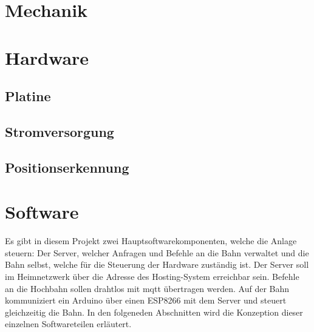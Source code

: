 \section{Mechanik}
\section{Hardware}
\subsection{Platine}
\subsection{Stromversorgung}
\subsection{Positionserkennung}

\section{Software}
Es gibt in diesem Projekt zwei Hauptsoftwarekomponenten, welche die Anlage steuern: Der Server, welcher Anfragen und Befehle an die Bahn verwaltet und die Bahn selbst,
welche für die Steuerung der Hardware zuständig ist. Der Server soll im Heimnetzwerk über die Adresse des Hosting-System erreichbar sein. Befehle an die Hochbahn sollen drahtlos mit \acrshort{mqtt} übertragen werden.
Auf der Bahn kommuniziert ein Arduino über einen ESP8266 mit dem Server und steuert gleichzeitig die Bahn. In den folgeneden Abschnitten wird die Konzeption dieser einzelnen Softwareteilen erläutert.


